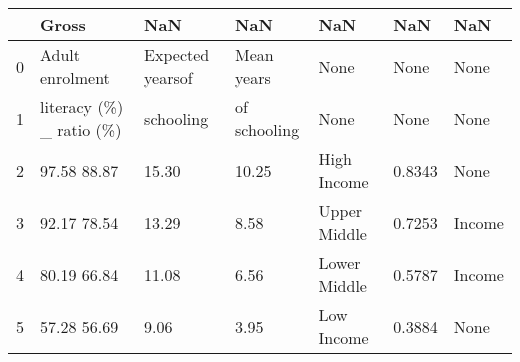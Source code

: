 \begin{tabular}{lllllll}
\toprule
{} &                     Gross &               NaN &           NaN &           NaN &     NaN &     NaN \\
\midrule
0 &           Adult enrolment &  Expected yearsof &    Mean years &          None &    None &    None \\
1 &  literacy (\%) \_ ratio (\%) &         schooling &  of schooling &          None &    None &    None \\
2 &               97.58 88.87 &             15.30 &         10.25 &   High Income &  0.8343 &    None \\
3 &               92.17 78.54 &             13.29 &          8.58 &  Upper Middle &  0.7253 &  Income \\
4 &               80.19 66.84 &             11.08 &          6.56 &  Lower Middle &  0.5787 &  Income \\
5 &               57.28 56.69 &              9.06 &          3.95 &    Low Income &  0.3884 &    None \\
\bottomrule
\end{tabular}
